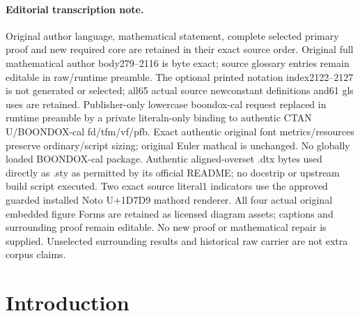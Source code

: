 \documentclass[11pt]{article}
\theoremstyle{definition}
\begin{document}
\paragraph{Editorial transcription note.}
Original author language, mathematical statement, complete selected primary proof and new required core are retained in their exact source order. Original full mathematical author body279–2116 is byte exact; source glossary entries remain editable in raw/runtime preamble. The optional printed notation index2122–2127 is not generated or selected; all65 actual source newconstant definitions and61 gls uses are retained. Publisher-only lowercase boondox-cal request replaced in runtime preamble by a private literaln-only binding to authentic CTAN U/BOONDOX-cal fd/tfm/vf/pfb. Exact authentic original font metrics/resources preserve ordinary/script sizing; original Euler mathcal is unchanged. No globally loaded BOONDOX-cal package. Authentic aligned-overset .dtx bytes used directly as .sty as permitted by its official README; no docstrip or upstream build script executed. Two exact source literal1 indicators use the approved guarded installed Noto U+1D7D9 mathord renderer. All four actual original embedded figure Forms are retained as licensed diagram assets; captions and surrounding proof remain editable. No new proof or mathematical repair is supplied. Unselected surrounding results and historical raw carrier are not extra corpus claims.
\clearpage

\section{Introduction}
\label{sec:intro}
\end{document}
